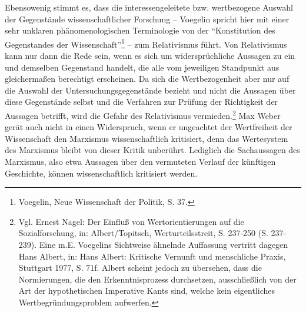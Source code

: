 Ebensowenig stimmt es, dass die interessengeleitete bzw. wertbezogene Auswahl
der Gegenstände wissenschaftlicher Forschung -- Voegelin spricht hier mit einer
sehr unklaren phänomenologischen Terminologie von der "`Konstitution des
Gegenstandes der Wissenschaft"'\footnote{Voegelin, Neue Wissenschaft der
  Politik, S. 37.} -- zum Relativismus führt. Von Relativismus kann nur dann
die Rede sein, wenn es sich um widersprüchliche Aussagen zu ein und demselben
Gegenstand handelt, die alle vom jeweiligen Standpunkt aus gleichermaßen
berechtigt erscheinen. Da sich die Wertbezogenheit aber nur auf die Auswahl
der Untersuchungsgegenstände bezieht und nicht die Aussagen über diese
Gegenstände selbst und die Verfahren zur Prüfung der Richtigkeit der Aussagen
betrifft, wird die Gefahr des Relativismus vermieden.\footnote{Vgl. Ernest
  Nagel: Der Einfluß von Wertorientierungen auf die Sozialforschung, in:
  Albert/Topitsch, Werturteilsstreit, S. 237-250 (S. 237-239). Eine m.E.
  Voegelins Sichtweise ähnelnde Auf\/fassung vertritt dagegen Hans Albert, in:
  Hans Albert: Kritische Vernunft und menschliche Praxis, Stuttgart 1977, S.
  71f. Albert scheint jedoch zu übersehen, dass die Normierungen, die den
  Erkenntnisprozess durchsetzen, ausschließlich von der Art der hypothetischen
  Imperative Kants sind, welche kein eigentliches Wertbegründungsproblem
  aufwerfen.} Max Weber gerät auch nicht in einen Widerspruch, wenn er
ungeachtet der Wertfreiheit der Wissenschaft den Marxismus wissenschaftlich
kritisiert, denn das Wertesystem des Marxismus bleibt von dieser Kritik
unberührt. Lediglich die Sachaussagen des Marxismus, also etwa Aussagen über
den vermuteten Verlauf der künftigen Geschichte, können wissenschaftlich
kritisiert werden.

